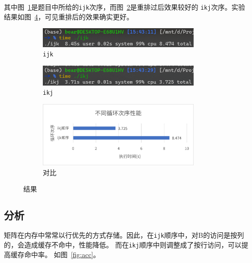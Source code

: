 \documentclass[a4paper,twoside]{article}
\begin{document}
\begin{spacing}{1.2}
其中图~\ref{fig:ijk}是题目中所给的\texttt{ijk}次序，而图~\ref{fig:ikj}是重排过后效果较好的
\texttt{ikj}次序。实验结果如图~\ref{fig:res}，可见重排后的效果确实更好。
\begin{figure}[H]
	\centering
	\begin{subfigure}{0.4\textwidth}
		\centering
		\caption{\texttt{ijk}}
		\label{fig:ijk}
		\includegraphics[width=0.9\textwidth]{ijk.png}
	\end{subfigure}
	\begin{subfigure}{0.4\textwidth}
		\centering
		\caption{\texttt{ikj}}
		\label{fig:ikj}
		\includegraphics[width=0.9\textwidth]{ikj.png}
	\end{subfigure}
	\begin{subfigure}{0.8\textwidth}
		\centering
		\caption{对比}
		\label{fig:cmp}
		\includegraphics[width=0.9\textwidth]{cmp.png}
	\end{subfigure}
	\caption{结果}
	\label{fig:res}
\end{figure}

\subsection{分析}

矩阵在内存中常常以行优先的方式存储。因此，在\texttt{ijk}顺序中，对B的访问是按列的，会造成缓存不命中，性能降低。
而在\texttt{ikj}顺序中则调整成了按行访问，可以提高缓存命中率。
如图~\ref{fig:acc}。


\end{spacing}
\end{document}
